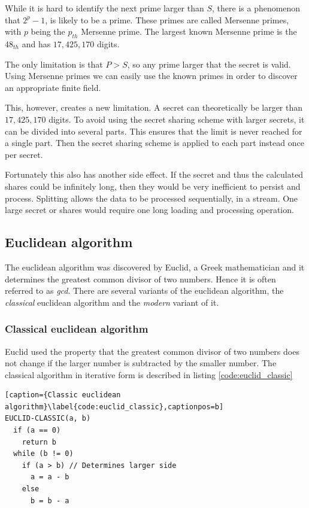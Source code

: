 While it is hard to identify the next prime larger than $S$, there is
a phenomenon that $2^p-1$, is likely to be a prime. These primes are called
Mersenne primes, with $p$ being the $p_{th}$ Mersenne prime. The largest known
Mersenne prime is the 48$_{th}$ and has $17,425,170$ digits.

The only limitation is that $P > S$, so any prime larger that the
secret is valid. Using Mersenne primes we can easily use the known primes in
order to discover an appropriate finite field.

This, however, creates a new limitation. A secret can theoretically be larger
than $17,425,170$ digits. To avoid using the secret sharing scheme with larger
secrets, it can be divided into several parts. This ensures that the limit
is never reached for a single part. Then the secret sharing scheme is applied to
each part instead once per secret.

Fortunately this also has another side effect. If the secret and thus the
calculated shares could be infinitely long, then they would be very inefficient
to persist and process. Splitting allows the data to be processed sequentially,
in a stream. One large secret or shares would require one long loading and
processing operation.

\subsection{Euclidean algorithm}

The euclidean algorithm was discovered by Euclid, a Greek mathematician and it
determines the greatest common divisor of two numbers.
Hence it is often referred to as \textit{gcd}. There are several variants
of the euclidean algorithm, the \textit{classical} euclidean algorithm and the
\textit{modern} variant of it.

\subsubsection{Classical euclidean algorithm}

Euclid used the property that the greatest common divisor of two numbers does
not change if the larger number is subtracted by the smaller number. The classical
algorithm in iterative form is described in listing \ref{code:euclid_classic}

\begin{lstlisting}[caption={Classic euclidean algorithm}\label{code:euclid_classic},captionpos=b]
EUCLID-CLASSIC(a, b)
  if (a == 0)
    return b
  while (b != 0)
    if (a > b) // Determines larger side
      a = a - b
    else
      b = b - a
\end{lstlisting}

